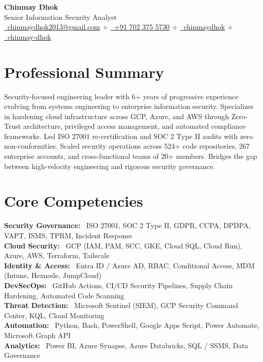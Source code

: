 \documentclass[11pt, letterpaper]{article}
\newcommand{\skilltag}[1]{%
  \small\textbf{\color{darktext}#1:}~%
}
\begin{document}
\begin{center}
    {\Huge\bfseries\color{darktext} Chinmay Dhok} \\[6pt]
    {\large\color{accent} Senior Information Security Analyst} \\[8pt]
    \small\color{graytext}
    \href{mailto:chinmaydhok2013@gmail.com}{\faEnvelope\ chinmaydhok2013@gmail.com}
    \quad$\diamond$\quad
    \href{tel:+917023755730}{\faPhone\ +91 702 375 5730}
    \quad$\diamond$\quad
    \href{https://linkedin.com/in/chinmaydhok}{\faLinkedin\ chinmaydhok}
    \quad$\diamond$\quad
    \href{https://github.com/chinmay-dhok}{\faGithub\ chinmay-dhok}
\end{center}

\vspace{-8pt}

\section{Professional Summary}
\small{\color{darktext}Security-focused engineering leader with 6+ years of progressive experience evolving from systems engineering to enterprise information security. Specializes in hardening cloud infrastructure across GCP, Azure, and AWS through Zero-Trust architecture, privileged access management, and automated compliance frameworks. Led ISO 27001 re-certification and SOC 2 Type II audits with zero non-conformities. Scaled security operations across 524+ code repositories, 267 enterprise accounts, and cross-functional teams of 20+ members. Bridges the gap between high-velocity engineering and rigorous security governance.}

\section{Core Competencies}
\begin{itemize}[leftmargin=0.15in, label={}]
    \small{\item{
     \skilltag{Security Governance} ISO 27001, SOC 2 Type II, GDPR, CCPA, DPDPA, VAPT, ISMS, TPRM, Incident Response \\[2pt]
     \skilltag{Cloud Security} GCP (IAM, PAM, SCC, GKE, Cloud SQL, Cloud Run), Azure, AWS, Terraform, Tailscale \\[2pt]
     \skilltag{Identity \& Access} Entra ID / Azure AD, RBAC, Conditional Access, MDM (Intune, Hexnode, JumpCloud) \\[2pt]
     \skilltag{DevSecOps} GitHub Actions, CI/CD Security Pipelines, Supply Chain Hardening, Automated Code Scanning \\[2pt]
     \skilltag{Threat Detection} Microsoft Sentinel (SIEM), GCP Security Command Center, KQL, Cloud Monitoring \\[2pt]
     \skilltag{Automation} Python, Bash, PowerShell, Google Apps Script, Power Automate, Microsoft Graph API \\[2pt]
     \skilltag{Analytics} Power BI, Azure Synapse, Azure Databricks, SQL / SSMS, Data Governance
    }}
\end{itemize}
\end{document}
